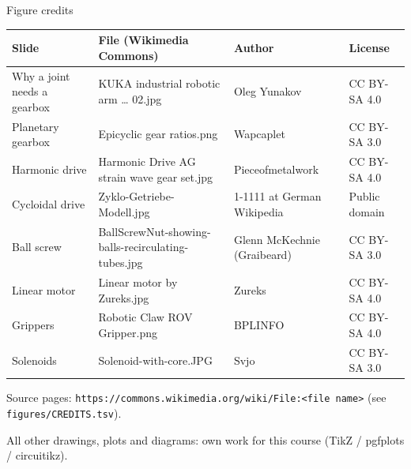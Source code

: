 \documentclass[aspectratio=169,10pt]{beamer}
\begin{document}
\begin{frame}{Figure credits}
\scriptsize
\renewcommand{\arraystretch}{1.1}
\begin{tabularx}{\textwidth}{@{}l l X l@{}}
\toprule
\textbf{Slide} & \textbf{File (Wikimedia Commons)} & \textbf{Author} & \textbf{License}\\
\midrule
Why a joint needs a gearbox & KUKA industrial robotic arm \dots{} 02.jpg & Oleg Yunakov & CC BY-SA 4.0\\
Planetary gearbox & Epicyclic gear ratios.png & Wapcaplet & CC BY-SA 3.0\\
Harmonic drive & Harmonic Drive AG strain wave gear set.jpg & Pieceofmetalwork & CC BY-SA 4.0\\
Cycloidal drive & Zyklo-Getriebe-Modell.jpg & 1-1111 at German Wikipedia & Public domain\\
Ball screw & BallScrewNut-showing-balls-recirculating-tubes.jpg & Glenn McKechnie (Graibeard) & CC BY-SA 3.0\\
Linear motor & Linear motor by Zureks.jpg & Zureks & CC BY-SA 4.0\\
Grippers & Robotic Claw ROV Gripper.png & BPLINFO & CC BY-SA 4.0\\
Solenoids & Solenoid-with-core.JPG & Svjo & CC BY-SA 3.0\\
\bottomrule
\end{tabularx}
{\tiny Source pages: \texttt{https://commons.wikimedia.org/wiki/File:<file name>} (see \texttt{figures/CREDITS.tsv}).}
\vspace{2mm}

All other drawings, plots and diagrams: own work for this course (TikZ / pgfplots / circuitikz).
\end{frame}
\end{document}
